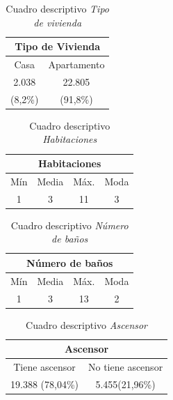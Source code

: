 \documentclass[conference, 10pt]{IEEEtran}
\begin{document}
\begin{table}[htbp]
\caption{Cuadro descriptivo \textit{Tipo de vivienda}}
\begin{center}
\begin{tabular}{|c|c|}
\hline
\multicolumn{2}{|c|}{\textbf{Tipo de Vivienda}} \\
\cline{1-2} 
\hline
 Casa&Apartamento\\
 2.038&22.805\\
 (8,2\%)&(91,8\%)\\
 
	\hline
\end{tabular}
\label{tab_2}
\end{center}
\end{table}

\begin{table}[htbp]
\caption{Cuadro descriptivo \textit{Habitaciones}}
\begin{center}
\begin{tabular}{|c|c|c|c|}
\hline
\multicolumn{4}{|c|}{\textbf{Habitaciones}} \\
\cline{1-4} 
\hline
 Mín&Media&Máx.&Moda\\
\hline
 1&3&11&3\\
 	\hline
\end{tabular}
\label{tab_3}
\end{center}
\end{table}

\begin{table}[htbp]
\caption{Cuadro descriptivo \textit{Número de baños}}
\begin{center}
\begin{tabular}{|c|c|c|c|}
\hline
\multicolumn{4}{|c|}{\textbf{Número de baños}} \\
\cline{1-4} 
\hline
 Mín&Media&Máx.&Moda\\
\hline
 1&3&13&2\\
 	\hline
\end{tabular}
\label{tab_4}
\end{center}
\end{table}

\begin{table}[htbp]
\caption{Cuadro descriptivo \textit{Ascensor}}
\begin{center}
\begin{tabular}{|c|c|}
\hline
\multicolumn{2}{|c|}{\textbf{Ascensor}} \\
\cline{1-2} 
\hline
 Tiene ascensor&No tiene ascensor\\
 19.388 (78,04\%)&5.455(21,96\%)\\
  
	\hline
\end{tabular}
\label{tab_5}
\end{center}
\end{table}
\end{document}
